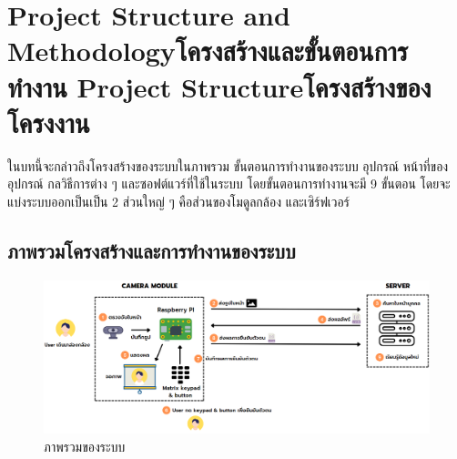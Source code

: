 \chapter{\ifproject%
\ifenglish Project Structure and Methodology\else โครงสร้างและขั้นตอนการทำงาน\fi
\else%
\ifenglish Project Structure\else โครงสร้างของโครงงาน\fi
\fi
}

ในบทนี้จะกล่าวถึงโครงสร้างของระบบในภาพรวม ขั้นตอนการทํางานของระบบ อุปกรณ์ หน้าที่ของอุปกรณ์ กลวิธีการต่าง ๆ และซอฟต์แวร์ที่ใช้ในระบบ โดยขั้นตอนการทํางานจะมี 9 ขั้นตอน
โดยจะแบ่งระบบออกเป็นเป็น 2 ส่วนใหญ่ ๆ คือส่วนของโมดูลกล้อง และเซิร์ฟเวอร์

\makeatletter


\makeatother

\section{ภาพรวมโครงสร้างและการทำงานของระบบ}


\begin{figure}[ht!]
  \begin{center}
    \includegraphics[scale=.5]{pic/overview.png}
  \caption[ภาพรวมของระบบ]{ภาพรวมของระบบ}
  \end{center}
  \label{fig:overview}
\end{figure}

